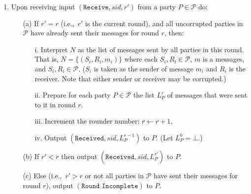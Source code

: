 \documentclass[a4paper]{article}
\begin{document}
\begin{framed}
\begin{enumerate}
        \item Upon receiving input $(\texttt{Receive}, sid, r')$ from a party $P \in \mathcal{P}$ do:
            \begin{enumerate}
                \item[(a)] If $r' = r$ (i.e.,\ $r'$ is the current round), and all uncorrupted parties in $\mathcal{P}$ have already sent their messages for round $r$, then:
                    \begin{enumerate}
                        \item[i.] Interpret $N$ as the list of messages sent by all parties in this round. That is, $N = \{(S_i, R_i, m_i)\}$ where each $S_i, R_i \in \mathcal{P}$, $m$ is a messages, and $S_i, R_i \in \mathcal{P}$. ($S_i$ is taken as the sender of message $m_i$ and $R_i$ is the receiver. Note that either sender or receiver may be corrupted.)
                        \item[ii.] Prepare for each party $P \in \mathcal{P}$ the list $L^r_P$ of messages that were sent to it in round $r$.
                        \item[iii.] Increment the rounder number: $r \leftarrow r + 1$.
                        \item[iv.] Output $(\texttt{Received}, sid, L^{r-1}_P)$ to $P$. (Let $L^0_P = \bot$.)
                    \end{enumerate}
                \item[(b)] If $r' < r$ then output $(\texttt{Received}, sid, L^{r'}_P)$ to $P$.
                \item[(c)] Else (i.e.,\ $r' > r$ or not all parties in $\mathcal{P}$ have sent their messages for round $r$), output $(\texttt{Round Incomplete})$ to $P$.
            \end{enumerate}
    \end{enumerate}
\end{framed}




\end{document}
